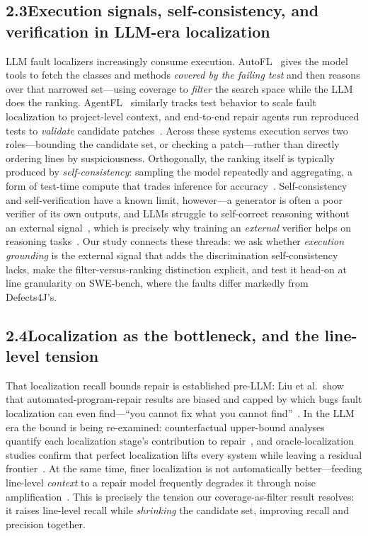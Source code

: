 \documentclass[11pt]{article}
\begin{document}
\subsection*{2.3\quad Execution signals, self-consistency, and verification in LLM-era localization}
LLM fault localizers increasingly consume execution. AutoFL~\citep{autofl} gives the model tools to fetch the classes and methods \emph{covered by the failing test} and then reasons over that narrowed set---using coverage to \emph{filter} the search space while the LLM does the ranking. AgentFL~\citep{agentfl} similarly tracks test behavior to scale fault localization to project-level context, and end-to-end repair agents run reproduced tests to \emph{validate} candidate patches~\citep{autocoderover,sweagent}. Across these systems execution serves two roles---bounding the candidate set, or checking a patch---rather than directly ordering lines by suspiciousness. Orthogonally, the ranking itself is typically produced by \emph{self-consistency}: sampling the model repeatedly and aggregating, a form of test-time compute that trades inference for accuracy~\citep{self_consistency,test_time_compute}. Self-consistency and self-verification have a known limit, however---a generator is often a poor verifier of its own outputs, and LLMs struggle to self-correct reasoning without an external signal~\citep{llm_as_judge,cannot_self_correct}, which is precisely why training an \emph{external} verifier helps on reasoning tasks~\citep{verifiers}. Our study connects these threads: we ask whether \emph{execution grounding} is the external signal that adds the discrimination self-consistency lacks, make the filter-versus-ranking distinction explicit, and test it head-on at line granularity on SWE-bench, where the faults differ markedly from Defects4J's.

\subsection*{2.4\quad Localization as the bottleneck, and the line-level tension}
That localization recall bounds repair is established pre-LLM: Liu et al.\ show that automated-program-repair results are biased and capped by which bugs fault localization can even find---``you cannot fix what you cannot find''~\citep{liu_cannotfix}. In the LLM era the bound is being re-examined: counterfactual upper-bound analyses quantify each localization stage's contribution to repair~\citep{rgfl}, and oracle-localization studies confirm that perfect localization lifts every system while leaving a residual frontier~\citep{beyondloc}. At the same time, finer localization is not automatically better---feeding line-level \emph{context} to a repair model frequently degrades it through noise amplification~\citep{flcontext}. This is precisely the tension our coverage-as-filter result resolves: it raises line-level recall while \emph{shrinking} the candidate set, improving recall and precision together.
\end{document}
